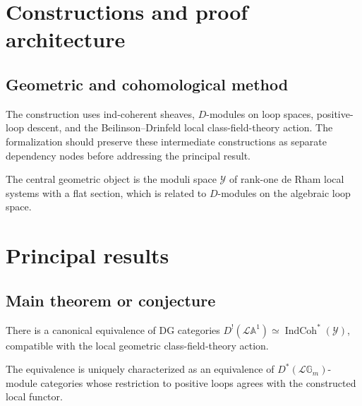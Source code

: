 \chapter{Constructions and proof architecture}
\label{chap:tates-thesis-de-rham-setting-method}

\section{Geometric and cohomological method}
\label{sec:tates-thesis-de-rham-setting-method}

The construction uses ind-coherent sheaves, $D$-modules on loop spaces, positive-loop descent, and the Beilinson--Drinfeld local class-field-theory action. The formalization should preserve these intermediate constructions
as separate dependency nodes before addressing the principal result.

\begin{definition}
\label{tates-thesis-de-rham-setting-central-object}
The central geometric object is the moduli space $\mathcal Y$ of rank-one de Rham local systems with a flat section, which is related to $D$-modules on the algebraic loop space.
\notready
\end{definition}

\chapter{Principal results}
\label{chap:tates-thesis-de-rham-setting-results}

\section{Main theorem or conjecture}
\label{sec:tates-thesis-de-rham-setting-results}

\begin{theorem}
\label{tates-thesis-de-rham-setting-main}
There is a canonical equivalence of DG categories $D^!(\mathcal L\mathbb A^1)\simeq\operatorname{IndCoh}^*(\mathcal Y)$, compatible with the local geometric class-field-theory action.
\notready
\end{theorem}

\begin{theorem}
\label{tates-thesis-de-rham-setting-secondary}
The equivalence is uniquely characterized as an equivalence of $D^*(\mathcal L\mathbb G_m)$-module categories whose restriction to positive loops agrees with the constructed local functor.
\notready
\end{theorem}
